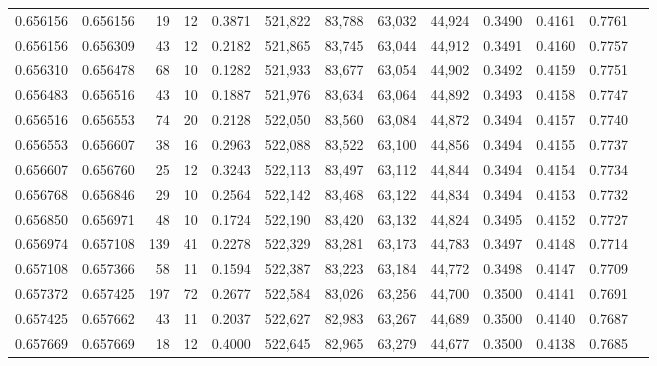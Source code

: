 \begin{tabular}{rrrrrrrrrrrrr}
0.656156 & 0.656156 &    19 &  12 &                                     0.3871 & 521,822 &  83,788 &  63,032 &  44,924 & 0.3490 & 0.4161 & 0.7761 \\
0.656156 & 0.656309 &    43 &  12 &                                     0.2182 & 521,865 &  83,745 &  63,044 &  44,912 & 0.3491 & 0.4160 & 0.7757 \\
0.656310 & 0.656478 &    68 &  10 &                                     0.1282 & 521,933 &  83,677 &  63,054 &  44,902 & 0.3492 & 0.4159 & 0.7751 \\
0.656483 & 0.656516 &    43 &  10 &                                     0.1887 & 521,976 &  83,634 &  63,064 &  44,892 & 0.3493 & 0.4158 & 0.7747 \\
0.656516 & 0.656553 &    74 &  20 &                                     0.2128 & 522,050 &  83,560 &  63,084 &  44,872 & 0.3494 & 0.4157 & 0.7740 \\
0.656553 & 0.656607 &    38 &  16 &                                     0.2963 & 522,088 &  83,522 &  63,100 &  44,856 & 0.3494 & 0.4155 & 0.7737 \\
0.656607 & 0.656760 &    25 &  12 &                                     0.3243 & 522,113 &  83,497 &  63,112 &  44,844 & 0.3494 & 0.4154 & 0.7734 \\
0.656768 & 0.656846 &    29 &  10 &                                     0.2564 & 522,142 &  83,468 &  63,122 &  44,834 & 0.3494 & 0.4153 & 0.7732 \\
0.656850 & 0.656971 &    48 &  10 &                                     0.1724 & 522,190 &  83,420 &  63,132 &  44,824 & 0.3495 & 0.4152 & 0.7727 \\
0.656974 & 0.657108 &   139 &  41 &                                     0.2278 & 522,329 &  83,281 &  63,173 &  44,783 & 0.3497 & 0.4148 & 0.7714 \\
0.657108 & 0.657366 &    58 &  11 &                                     0.1594 & 522,387 &  83,223 &  63,184 &  44,772 & 0.3498 & 0.4147 & 0.7709 \\
0.657372 & 0.657425 &   197 &  72 &                                     0.2677 & 522,584 &  83,026 &  63,256 &  44,700 & 0.3500 & 0.4141 & 0.7691 \\
0.657425 & 0.657662 &    43 &  11 &                                     0.2037 & 522,627 &  82,983 &  63,267 &  44,689 & 0.3500 & 0.4140 & 0.7687 \\
0.657669 & 0.657669 &    18 &  12 &                                     0.4000 & 522,645 &  82,965 &  63,279 &  44,677 & 0.3500 & 0.4138 & 0.7685 \\

\end{tabular}
